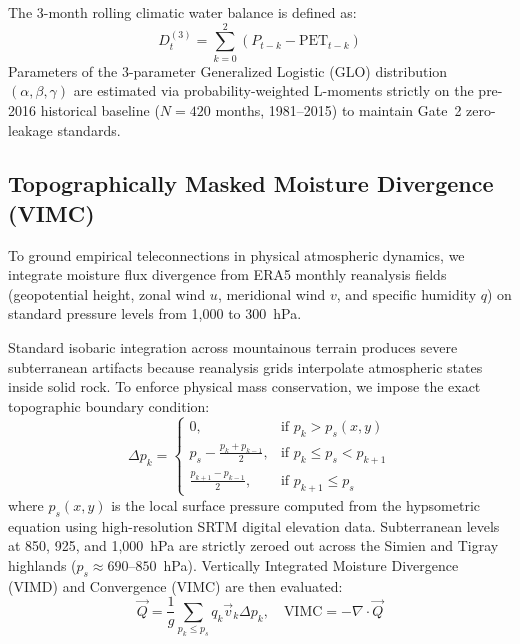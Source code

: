 \documentclass{article}
\begin{document}
The 3-month rolling climatic water balance is defined as:
\begin{equation}
D_t^{(3)} = \sum_{k=0}^{2} \left( P_{t-k} - \text{PET}_{t-k} \right)
\label{eq:water_balance}
\end{equation}
Parameters of the 3-parameter Generalized Logistic (GLO) distribution $(\alpha, \beta, \gamma)$ are estimated via probability-weighted L-moments strictly on the pre-2016 historical baseline ($N = 420$ months, 1981--2015) to maintain Gate~2 zero-leakage standards.

\subsection{Topographically Masked Moisture Divergence (VIMC)}
To ground empirical teleconnections in physical atmospheric dynamics, we integrate moisture flux divergence from ERA5 monthly reanalysis fields (geopotential height, zonal wind $u$, meridional wind $v$, and specific humidity $q$) on standard pressure levels from 1,000 to 300~hPa.

Standard isobaric integration across mountainous terrain produces severe subterranean artifacts because reanalysis grids interpolate atmospheric states inside solid rock. To enforce physical mass conservation, we impose the exact topographic boundary condition:
\begin{equation}
\Delta p_k = 
\begin{cases}
0, & \text{if } p_k > p_s(x,y) \\
p_s - \frac{p_k + p_{k-1}}{2}, & \text{if } p_k \le p_s < p_{k+1} \\
\frac{p_{k+1} - p_{k-1}}{2}, & \text{if } p_{k+1} \le p_s
\end{cases}
\label{eq:topomask}
\end{equation}
where $p_s(x,y)$ is the local surface pressure computed from the hypsometric equation using high-resolution SRTM digital elevation data. Subterranean levels at 850, 925, and 1,000~hPa are strictly zeroed out across the Simien and Tigray highlands ($p_s \approx 690$--$850$~hPa). Vertically Integrated Moisture Divergence (VIMD) and Convergence (VIMC) are then evaluated:
\begin{equation}
\vec{Q} = \frac{1}{g} \sum_{p_k \le p_s} q_k \vec{v}_k \Delta p_k, \quad \text{VIMC} = -\nabla \cdot \vec{Q}
\label{eq:vimc}
\end{equation}
\end{document}
